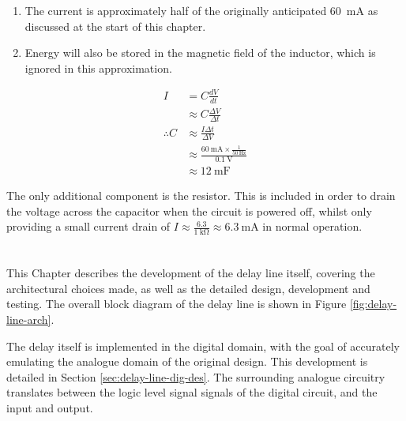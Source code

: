 \begin{enumerate}
	\item The current is approximately half of the originally anticipated \SI{60}{\milli\ampere} as discussed at the start of this chapter.
	\item Energy will also be stored in the magnetic field of the inductor, which is ignored in this approximation.
\end{enumerate}

\begin{align}
I &= C \frac{dV}{dt} \nonumber \\
&\approx C \frac{\Delta V}{ \Delta t} \nonumber \\
\therefore C &\approx \frac{I \Delta t}{\Delta V} \nonumber \\
&\approx \frac{\SI{60}{\milli\ampere} \times \frac{1}{\SI{50}{\hertz}} }{\SI{0.1}{\volt}} \nonumber \\
&\approx \SI{12}{\milli\farad} \label{eq:delay-line-ripple}
\end{align}

The only additional component is the resistor. This is included in order to drain the voltage across the capacitor when the circuit is powered off, whilst only providing a small current drain of $I \approx \frac{6.3}{\SI{1}{\kilo\ohm}} \approx \SI{6.3}{\milli\ampere}$ in normal operation.

\chapter{}

This Chapter describes the development of the delay line itself, covering the architectural choices made, as well as the detailed design, development and testing. The overall block diagram of the delay line is shown in Figure \ref{fig:delay-line-arch}.

The delay itself is implemented in the digital domain, with the goal of accurately emulating the analogue domain of the original design. This development is detailed in Section \ref{sec:delay-line-dig-des}. The surrounding analogue circuitry translates between the logic level signal signals of the digital circuit, and the input and output.

